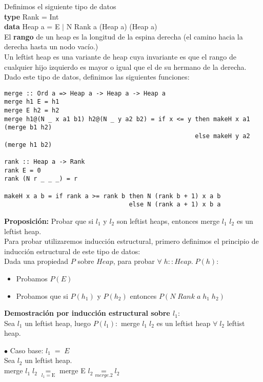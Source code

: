 \documentclass[11pt]{article}
\begin{document}
\noindent Definimos el siguiente tipo de datos \\
\textbf{type} Rank = Int \\
\textbf{data} Heap a = E $\vert$ N Rank a (Heap a) (Heap a) \\

\noindent El \textbf{rango} de un heap es la longitud de la espina derecha (el camino hacia
la derecha hasta un nodo vacío.) \\
Un leftist heap es una variante de heap cuya invariante es que el rango de
cualquier hijo izquierdo es mayor o igual que el de su hermano de la derecha.
Dado este tipo de datos, definimos las siguientes funciones:
\begin{verbatim}
merge :: Ord a => Heap a -> Heap a -> Heap a
merge h1 E = h1
merge E h2 = h2
merge h1@(N _ x a1 b1) h2@(N _ y a2 b2) = if x <= y then makeH x a1 (merge b1 h2)
                                                    else makeH y a2 (merge h1 b2)

rank :: Heap a -> Rank
rank E = 0
rank (N r _ _ _) = r

makeH x a b = if rank a >= rank b then N (rank b + 1) x a b
                                  else N (rank a + 1) x b a
\end{verbatim}

\noindent\textbf{Proposición:} Probar que si $l_1$ y $l_2$ son leftist heaps, entonces
merge $l_1$ $l_2$ es un leftist heap. \\
Para probar utilizaremos inducción estructural, primero definimos el principio de
inducción estructural de este tipo de datos: \\
Dada una propiedad $P$ sobre $Heap$, para probar $\forall \; h::Heap. \; P(h)$:
\begin{itemize}
  \item Probamos $P(E)$
  \item Probamos que si $P(h_1)$ y $P(h_2)$ entonces $P(N \; Rank \; a \; h_1 \; h_2)$
\end{itemize}
\textbf{Demostración por inducción estructural sobre $l_1$}: \\
Sea $l_1$ un leftist heap, luego $P(l_1):$ merge $l_1\;l_2$ es un leftist heap
$ \forall \; l_2$ leftist heap. 

\noindent $\bullet$ Caso base: $l_1\;=\;E$ \\
\indent \indent Sea $l_2$ un leftist heap. \\
\indent \indent merge $l_1 \; l_2 \; \underset{l_1 = \text{E}}{=} $ merge E $l_2 \underset{merge. 2}{=} l_2$ \\
\end{document}
